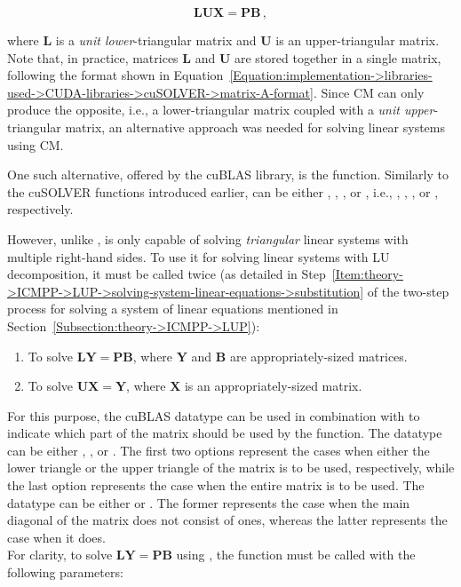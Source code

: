 \begin{equation}
	\mathbf{LUX} = \mathbf{PB} \,,
	\label{Equation:implementation->libraries-used->CUDA-libraries->cuBLAS->cusolverDnXgetrs-system-of-equations}
\end{equation}

where $\mathbf{L}$ is a \textit{unit lower}-triangular matrix and $\mathbf{U}$ is an upper-triangular matrix. Note that, in practice, matrices $\mathbf{L}$ and $\mathbf{U}$ are stored together in a single matrix, following the format shown in Equation~\ref{Equation:implementation->libraries-used->CUDA-libraries->cuSOLVER->matrix-A-format}. Since CM can only produce the opposite, i.e., a lower-triangular matrix coupled with a \textit{unit upper}-triangular matrix, an alternative approach was needed for solving linear systems using CM.

One such alternative, offered by the cuBLAS library, is the  function. Similarly to the cuSOLVER functions introduced earlier,  can be either , , , or , i.e., , , , or , respectively.

However, unlike ,  is only capable of solving \textit{triangular} linear systems with multiple right-hand sides. To use it for solving linear systems with LU decomposition, it must be called twice (as detailed in Step~\ref{Item:theory->ICMPP->LUP->solving-system-linear-equations->substitution} of the two-step process for solving a system of linear equations mentioned in Section~\ref{Subsection:theory->ICMPP->LUP}):

\begin{enumerate}
	\item To solve $\mathbf{LY}=\mathbf{PB}$, where $\mathbf{Y}$ and $\mathbf{B}$ are appropriately-sized matrices.
	\item To solve $\mathbf{UX}=\mathbf{Y}$, where $\mathbf{X}$ is an appropriately-sized matrix.
\end{enumerate}

For this purpose, the cuBLAS datatype  can be used in combination with  to indicate which part of the matrix should be used by the  function. The  datatype can be either , , or . The first two options represent the cases when either the lower triangle or the upper triangle of the matrix is to be used, respectively, while the last option represents the case when the entire matrix is to be used. The  datatype can be either  or . The former represents the case when the main diagonal of the matrix does not consist of ones, whereas the latter represents the case when it does.\\
For clarity, to solve $\mathbf{LY}=\mathbf{PB}$ using , the function must be called with the following parameters:

